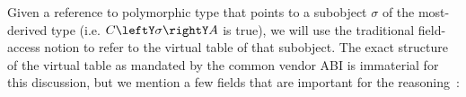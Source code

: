 
Given a reference  to polymorphic type  that points to a subobject 
$\sigma$ of the most-derived type  (i.e. $C\leftY\sigma\rightY A$ is 
true), we will use the traditional field-access notion  to refer to 
the virtual table of that subobject. The exact structure of the virtual table as 
mandated by the common vendor \Cpp{} ABI is immaterial for this discussion, but we 
mention a few fields that are important for the reasoning~\cite[.2]{C++ABI}:

